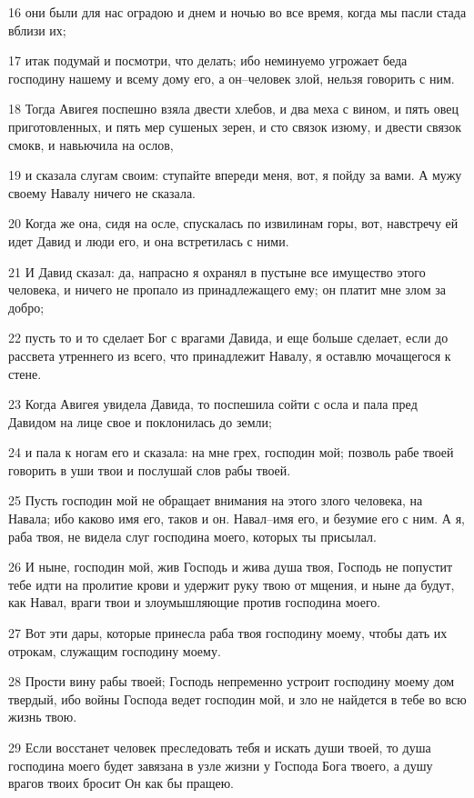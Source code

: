 \par 16 они были для нас оградою и днем и ночью во все время, когда мы пасли стада вблизи их;
\par 17 итак подумай и посмотри, что делать; ибо неминуемо угрожает беда господину нашему и всему дому его, а он--человек злой, нельзя говорить с ним.
\par 18 Тогда Авигея поспешно взяла двести хлебов, и два меха с вином, и пять овец приготовленных, и пять мер сушеных зерен, и сто связок изюму, и двести связок смокв, и навьючила на ослов,
\par 19 и сказала слугам своим: ступайте впереди меня, вот, я пойду за вами. А мужу своему Навалу ничего не сказала.
\par 20 Когда же она, сидя на осле, спускалась по извилинам горы, вот, навстречу ей идет Давид и люди его, и она встретилась с ними.
\par 21 И Давид сказал: да, напрасно я охранял в пустыне все имущество этого человека, и ничего не пропало из принадлежащего ему; он платит мне злом за добро;
\par 22 пусть то и то сделает Бог с врагами Давида, и еще больше сделает, если до рассвета утреннего из всего, что принадлежит Навалу, я оставлю мочащегося к стене.
\par 23 Когда Авигея увидела Давида, то поспешила сойти с осла и пала пред Давидом на лице свое и поклонилась до земли;
\par 24 и пала к ногам его и сказала: на мне грех, господин мой; позволь рабе твоей говорить в уши твои и послушай слов рабы твоей.
\par 25 Пусть господин мой не обращает внимания на этого злого человека, на Навала; ибо каково имя его, таков и он. Навал--имя его, и безумие его с ним. А я, раба твоя, не видела слуг господина моего, которых ты присылал.
\par 26 И ныне, господин мой, жив Господь и жива душа твоя, Господь не попустит тебе идти на пролитие крови и удержит руку твою от мщения, и ныне да будут, как Навал, враги твои и злоумышляющие против господина моего.
\par 27 Вот эти дары, которые принесла раба твоя господину моему, чтобы дать их отрокам, служащим господину моему.
\par 28 Прости вину рабы твоей; Господь непременно устроит господину моему дом твердый, ибо войны Господа ведет господин мой, и зло не найдется в тебе во всю жизнь твою.
\par 29 Если восстанет человек преследовать тебя и искать души твоей, то душа господина моего будет завязана в узле жизни у Господа Бога твоего, а душу врагов твоих бросит Он как бы пращею.
